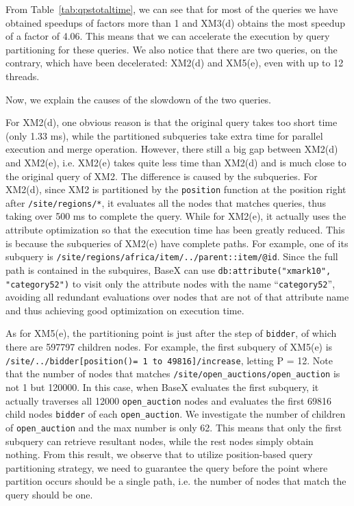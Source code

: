 From Table~\ref{tab:qpstotaltime}, we can see that for most of the queries we
have obtained speedups of factors  more than 1 and XM3(d) obtains the most
speedup of a factor of 4.06. This means that we can accelerate the execution by
query partitioning for these queries. We also notice that there are two queries,
on the contrary, which have been decelerated: XM2(d) and XM5(e), even with up to
12 threads.

Now, we explain the causes of the slowdown of the two queries.

For XM2(d), one obvious reason is that the original query takes too short time
(only 1.33 ms), while the partitioned  subqueries take extra time for parallel
execution and merge operation. However, there still a big gap between XM2(d) and
XM2(e), i.e. XM2(e) takes quite less time than XM2(d) and is much close to the
original query of XM2. The difference is caused by the subqueries. For XM2(d),
since XM2 is partitioned by the \texttt{position} function at the position right
after \texttt{/site/regions/*}, it evaluates all the nodes that matches queries,
thus taking over 500 ms to complete the query. While for XM2(e), it actually
uses the attribute optimization so that the execution time has been greatly
reduced. This is because the subqueries of XM2(e) have complete paths. For
example, one of its subquery is
\texttt{/site/regions/africa/item/../parent::item/@id}. Since the full path is
contained in the subquires, BaseX can use \texttt{db:attribute("xmark10",
"category52")} to visit only the attribute nodes with the name ``\texttt{category52}'',
avoiding all redundant evaluations over nodes that are not of that attribute
name and thus achieving good optimization on execution time.

As for XM5(e), the partitioning point is just after the step of \texttt{bidder},
of which there are 597797 children nodes. For example, the first subquery of
XM5(e) is\\ \verb|/site/../bidder[position()= 1 to 49816]/increase|, letting P =
12. Note that the number of nodes that matches
\verb|/site/open_auctions/open_auction| is not 1 but 120000. In this case,
when BaseX evaluates the first subquery,  it actually traverses all 12000
\texttt{open\_auction} nodes and evaluates the first 69816 child nodes
\texttt{bidder} of each \texttt{open\_auction}. We investigate the number of
children of \texttt{open\_auction} and the max number is only 62. This means
that only the first subquery can retrieve resultant nodes, while the rest nodes
simply obtain nothing. From this result, we observe that to utilize
position-based query partitioning strategy, we need to guarantee the query before the
point where partition occurs should be a single path, i.e. the number of nodes that match
the query should be one.




